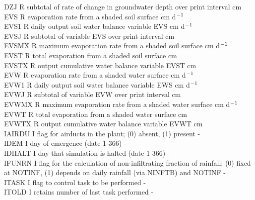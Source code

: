 \begin{tabbing}
DZJ\> \> R\> subtotal of rate of change in groundwater depth over print interval\> \> \> \> \> \> \> cm\\
EVS\> \> R\> evaporation rate from a shaded soil surface\> \> \> \> \> \> \> cm d$^{{\rm -1}}$\\
EVS1\> \> R\> daily output soil water balance variable EVS\> \> \> \> \> \> \> cm d$^{{\rm -1}}$\\
EVSJ\> \> R\> subtotal of variable EVS over print interval\> \> \> \> \> \> \> cm \\
EVSMX\> \> R\> maximum evaporation rate from a shaded soil surface\> \> \> \> \> \> \> cm d$^{{\rm -1}}$\\
EVST\> \> R\> total evaporation from a shaded soil surface\> \> \> \> \> \> \> cm\\
EVSTX\> \> R\> output cumulative water balance variable EVST\> \> \> \> \> \> \> cm\\
EVW\> \> R\> evaporation rate from a shaded water surface\> \> \> \> \> \> \> cm d$^{{\rm -1}}$\\
EVW1\> \> R\> daily output soil water balance variable EWS\> \> \> \> \> \> \> cm d$^{{\rm -1}}$\\
EVWJ\> \> R\> subtotal of variable EVW over print interval\> \> \> \> \> \> \> cm \\
EVWMX\> \> R\> maximum evaporation rate from a shaded water surface\> \> \> \> \> \> \> cm d$^{{\rm -1}}$\\
EVWT\> \> R\> total evaporation from a shaded water surface\> \> \> \> \> \> \> cm\\
EVWTX\> \> R\> output cumulative water balance variable EVWT\> \> \> \> \> \> \> cm\\
IAIRDU\> \> I\> flag for airducts in the plant; (0) absent, (1) present\> \> \> \> \> \> \> -\\
IDEM\> \> I\> day of emergence (date 1-366)\> \> \> \> \> \> \> -\\
IDHALT\> \> I\> day that simulation is halted (date 1-366)\> \> \> \> \> \> \> -\\
IFUNRN\> \> I\> flag for the calculation of non-infiltrating fraction of rainfall; (0) fixed\\
 \>\> \> at NOTINF, (1) depends on daily rainfall (via NINFTB) and NOTINF\> \> \> \> \> \> \> -\\
ITASK\> \> I\> flag to control task to be performed\> \> \> \> \> \> \> -\\
ITOLD\> \> I\> retains number of last task performed\> \> \> \> \> \> \> -\\

\end{tabbing}
